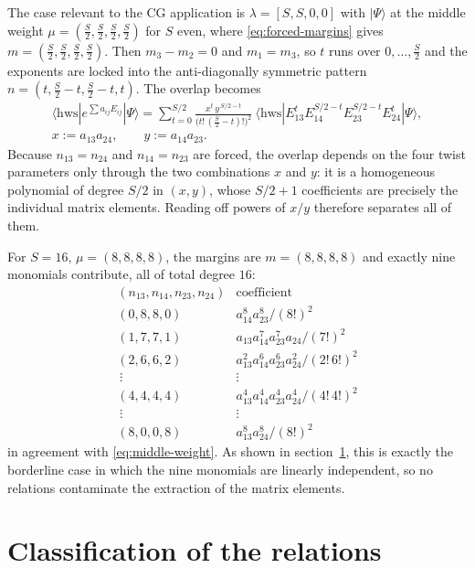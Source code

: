 \documentclass[12pt]{article}
\newcommand{\hws}{\mathrm{hws}}
\begin{document}
The case relevant to the CG application is $\lambda=[S,S,0,0]$ with
$|\Psi\rangle$ at the middle weight $\mu=(\tfrac{S}{2},\tfrac{S}{2},\tfrac{S}{2},\tfrac{S}{2})$
for $S$ even, where \eqref{eq:forced-margins} gives
$m=(\tfrac{S}{2},\tfrac{S}{2},\tfrac{S}{2},\tfrac{S}{2})$. Then $m_3-m_2=0$ and
$m_1=m_3$, so $t$ runs over $0,\dots,\tfrac{S}{2}$ and the exponents are locked
into the anti-diagonally symmetric pattern
$n=(t,\tfrac{S}{2}-t,\tfrac{S}{2}-t,t)$. The overlap becomes
\begin{equation}
\begin{gathered}
\langle\hws|e^{\sum a_{ij}E_{ij}}|\Psi\rangle
=\sum_{t=0}^{S/2}\frac{x^{t}\,y^{\,S/2-t}}{\big(t!\,(\tfrac{S}{2}-t)!\big)^{2}}\
\langle\hws|E_{13}^{t}E_{14}^{S/2-t}E_{23}^{S/2-t}E_{24}^{t}|\Psi\rangle,\\
x:=a_{13}a_{24},\qquad y:=a_{14}a_{23} .
\end{gathered}
\label{eq:middle-weight}
\end{equation}
Because $n_{13}=n_{24}$ and $n_{14}=n_{23}$ are forced, the overlap depends on
the four twist parameters only through the two combinations $x$ and $y$: it is a
homogeneous polynomial of degree $S/2$ in $(x,y)$, whose $S/2+1$ coefficients are
precisely the individual matrix elements. Reading off powers of $x/y$ therefore
separates all of them.

For $S=16$, $\mu=(8,8,8,8)$, the margins are $m=(8,8,8,8)$ and exactly nine
monomials contribute, all of total degree $16$:
\[
\begin{array}{c|c}
(n_{13},n_{14},n_{23},n_{24}) & \text{coefficient} \\ \hline
(0,8,8,0) & a_{14}^{8}a_{23}^{8}/(8!)^2 \\
(1,7,7,1) & a_{13}a_{14}^{7}a_{23}^{7}a_{24}/(7!)^2 \\
(2,6,6,2) & a_{13}^{2}a_{14}^{6}a_{23}^{6}a_{24}^{2}/(2!\,6!)^2 \\
\ \vdots\ & \vdots \\
(4,4,4,4) & a_{13}^{4}a_{14}^{4}a_{23}^{4}a_{24}^{4}/(4!\,4!)^2 \\
\ \vdots\ & \vdots \\
(8,0,0,8) & a_{13}^{8}a_{24}^{8}/(8!)^2
\end{array}
\]
in agreement with \eqref{eq:middle-weight}. As shown in
section~\ref{sec:relations}, this is exactly the borderline case in which the
nine monomials are linearly independent, so no relations contaminate the
extraction of the matrix elements.

\section{Classification of the relations}
\label{sec:relations}
\end{document}
